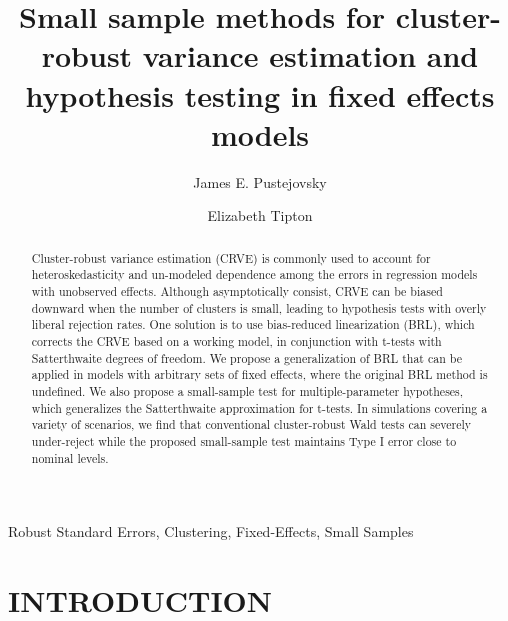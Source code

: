 \documentclass[draft]{ectaart}\usepackage[]{graphicx}\usepackage[]{color}
\begin{document}
\begin{frontmatter}
\title{Small sample methods for cluster-robust variance estimation and hypothesis testing in fixed effects models\protect{}}


\author{James E. Pustejovsky}
\author{Elizabeth Tipton}
\address[a]{University of Texas at Austin,
Educational Psychology Department,
1912 Speedway, Stop D5800, 
Austin, TX 78712.
Email: }
\address[b]{Teachers College, Columbia University,
Department of Human Development,
525 W. 120th St., Box 118,
New York, NY 10027. 
Email: }

\begin{abstract}
Cluster-robust variance estimation (CRVE) is commonly used to account for heteroskedasticity and un-modeled dependence among the errors in regression models with unobserved effects. Although asymptotically consist, CRVE can be biased downward when the number of clusters is small, leading to hypothesis tests with overly liberal rejection rates. One solution is to use bias-reduced linearization (BRL), which corrects the CRVE based on a working model, in conjunction with t-tests with Satterthwaite degrees of freedom. We propose a generalization of BRL that can be applied in models with arbitrary sets of fixed effects, where the original BRL method is undefined. We also propose a small-sample test for multiple-parameter hypotheses, which generalizes the Satterthwaite approximation for t-tests. In simulations covering a variety of scenarios, we find that conventional cluster-robust Wald tests can severely under-reject while the proposed small-sample test maintains Type I error close to nominal levels. 
\end{abstract}

\begin{keyword}
Robust Standard Errors, Clustering, Fixed-Effects, Small Samples
\end{keyword}

\end{frontmatter}

\section{INTRODUCTION}
\label{sec:intro}
\end{document}
